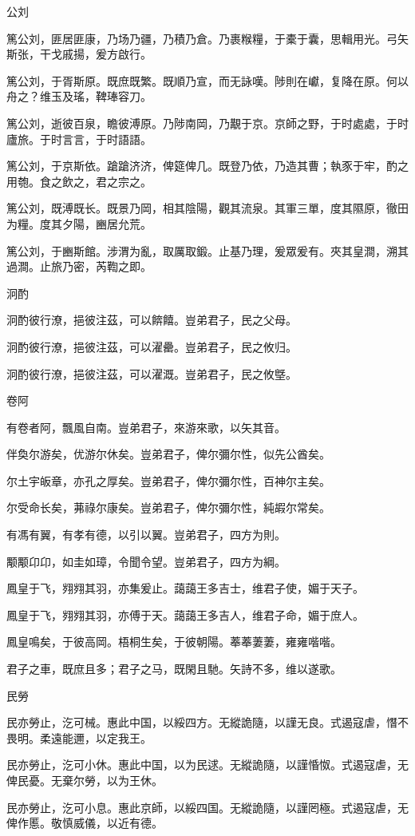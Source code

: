 公刘

篤公刘，匪居匪康，乃场乃疆，乃積乃倉。乃裹糇糧，于橐于囊，思輯用光。弓矢斯张，干戈戚揚，爰方啟行。

篤公刘，于胥斯原。既庶既繁。既順乃宣，而无詠嘆。陟則在巘，复降在原。何以舟之？维玉及瑤，鞞琫容刀。

篤公刘，逝彼百泉，瞻彼溥原。乃陟南岡，乃覯于京。京師之野，于时處處，于时廬旅。于时言言，于时語語。

篤公刘，于京斯依。蹌蹌济济，俾筵俾几。既登乃依，乃造其曹；執豕于牢，酌之用匏。食之飲之，君之宗之。

篤公刘，既溥既长。既景乃岡，相其陰陽，觀其流泉。其軍三單，度其隰原，徹田为糧。度其夕陽，豳居允荒。

篤公刘，于豳斯館。涉渭为亂，取厲取鍛。止基乃理，爰眾爰有。夾其皇澗，溯其過澗。止旅乃密，芮鞫之即。

泂酌

泂酌彼行潦，挹彼注茲，可以餴饎。豈弟君子，民之父母。

泂酌彼行潦，挹彼注茲，可以濯罍。豈弟君子，民之攸归。

泂酌彼行潦，挹彼注茲，可以濯溉。豈弟君子，民之攸墍。

卷阿

有卷者阿，飄風自南。豈弟君子，來游來歌，以矢其音。

伴奐尔游矣，优游尔休矣。豈弟君子，俾尔彌尔性，似先公酋矣。

尔土宇皈章，亦孔之厚矣。豈弟君子，俾尔彌尔性，百神尔主矣。

尔受命长矣，茀祿尔康矣。豈弟君子，俾尔彌尔性，純嘏尔常矣。

有馮有翼，有孝有德，以引以翼。豈弟君子，四方为則。

颙颙卬卬，如圭如璋，令聞令望。豈弟君子，四方为綱。

鳳皇于飞，翙翙其羽，亦集爰止。藹藹王多吉士，维君子使，媚于天子。

鳳皇于飞，翙翙其羽，亦傅于天。藹藹王多吉人，维君子命，媚于庶人。

鳳皇鳴矣，于彼高岡。梧桐生矣，于彼朝陽。菶菶萋萋，雍雍喈喈。

君子之車，既庶且多；君子之马，既閑且馳。矢詩不多，维以遂歌。

民勞

民亦勞止，汔可械。惠此中国，以綏四方。无縱詭隨，以謹无良。式遏寇虐，憯不畏明。柔遠能邇，以定我王。

民亦勞止，汔可小休。惠此中国，以为民逑。无縱詭隨，以謹惛怓。式遏寇虐，无俾民憂。无棄尔勞，以为王休。

民亦勞止，汔可小息。惠此京師，以綏四国。无縱詭隨，以謹罔極。式遏寇虐，无俾作慝。敬慎威儀，以近有德。

